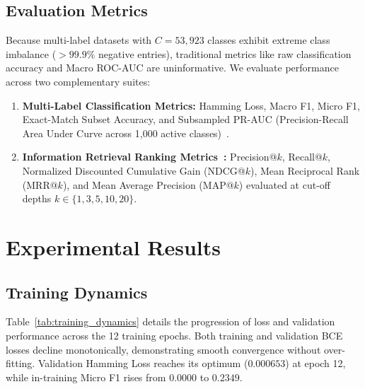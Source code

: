 \documentclass[11pt]{article}
\begin{document}
\subsection{Evaluation Metrics}
Because multi-label datasets with $C = 53{,}923$ classes exhibit extreme class imbalance ($>99.9\%$ negative entries), traditional metrics like raw classification accuracy and Macro ROC-AUC are uninformative. We evaluate performance across two complementary suites:
\begin{enumerate}
  \item \textbf{Multi-Label Classification Metrics:} Hamming Loss, Macro F1, Micro F1, Exact-Match Subset Accuracy, and Subsampled PR-AUC (Precision-Recall Area Under Curve across 1,000 active classes)~\cite{davis2006}.
  \item \textbf{Information Retrieval Ranking Metrics~\cite{croft2010,ndcg}:} Precision@$k$, Recall@$k$, Normalized Discounted Cumulative Gain (NDCG@$k$), Mean Reciprocal Rank (MRR@$k$), and Mean Average Precision (MAP@$k$) evaluated at cut-off depths $k \in \{1, 3, 5, 10, 20\}$.
\end{enumerate}

\section{Experimental Results}\label{sec:results}

\subsection{Training Dynamics}
Table~\ref{tab:training_dynamics} details the progression of loss and validation performance across the 12 training epochs. Both training and validation BCE losses decline monotonically, demonstrating smooth convergence without over-fitting. Validation Hamming Loss reaches its optimum ($0.000653$) at epoch 12, while in-training Micro F1 rises from $0.0000$ to $0.2349$.
\end{document}
